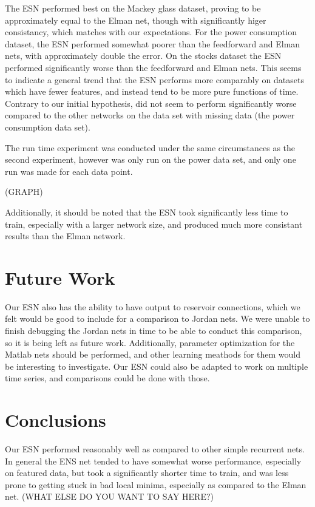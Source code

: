 \documentclass{acm_proc_article-sp}
\begin{document}
The ESN performed best on the Mackey glass dataset, proving to be approximately equal to the Elman net, though with significantly higer consistancy, which matches with our expectations. For the power consumption dataset, the ESN performed somewhat poorer than the feedforward and Elman nets, with approximately double the error. On the stocks dataset the ESN performed significantly worse than the feedforward and Elman nets. This seems to indicate a general trend that the ESN performs more comparably on datasets which have fewer features, and instead tend to be more pure functions of time. Contrary to our initial hypothesis, did not seem to perform significantly worse compared to the other networks on the data set with missing data (the power consumption data set). 

The run time experiment was conducted under the same circumstances as the second experiment, however was only run on the power data set, and only one run was made for each data point.

(GRAPH)

Additionally, it should be noted that the ESN took significantly less time to train, especially with a larger network size, and produced much more consistant results than the Elman network.

\section{Future Work}
Our ESN also has the ability to have output to reservoir connections, which we felt would be good to include for a comparison to Jordan nets. We were unable to finish debugging the Jordan nets in time to be able to conduct this comparison, so it is being left as future work. Additionally, parameter optimization for the Matlab nets should be performed, and other learning meathods for them would be interesting to investigate. Our ESN could also be adapted to work on multiple time series, and comparisons could be done with those.  

\section{Conclusions}
Our ESN performed reasonably well as compared to other simple recurrent nets. In general the ENS net tended to have somewhat worse performance, especially on featured data, but took a significantly shorter time to train, and was less prone to getting stuck in bad local minima, especially as compared to the Elman net. 
(WHAT ELSE DO YOU WANT TO SAY HERE?)
\end{document}
